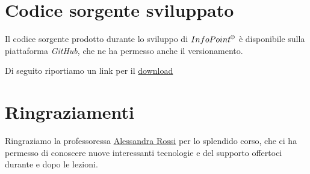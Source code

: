 \documentclass{./document_class}
\begin{document}
    \chapter{Codice sorgente sviluppato}
      Il codice sorgente prodotto durante lo sviluppo di $InfoPoint^{\copyright}$ è disponibile sulla piattaforma \emph{GitHub}, che ne ha permesso anche il versionamento.

      Di seguito riportiamo un link per il \href{https://github.com/luftmensch-luftmensch/InfoPoint/}{download}\footnotemark {}

    \chapter{Ringraziamenti}
        Ringraziamo la professoressa \href{mailto:alessandra.rossi@unina.it}{Alessandra Rossi} per lo splendido corso, che ci ha permesso di conoscere nuove interessanti tecnologie e del supporto offertoci durante e dopo le lezioni.

    \credits
   
\end{document}

